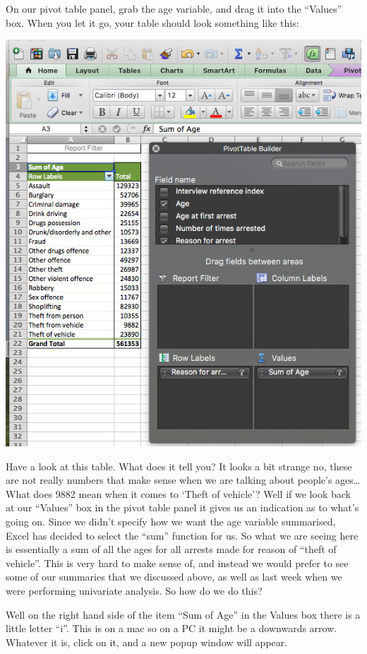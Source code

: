 \documentclass[]{book}
\theoremstyle{definition}
\theoremstyle{definition}
\theoremstyle{definition}
\theoremstyle{remark}
\begin{document}
On our pivot table panel, grab the age variable, and drag it into the
``Values'' box. When you let it go, your table should look something
like this:

\includegraphics{imgs/age_to_value.png}

Have a look at this table. What does it tell you? It looks a bit strange
no, these are not really numbers that make sense when we are talking
about people's ages\ldots{} What does 9882 mean when it comes to `Theft
of vehicle'? Well if we look back at our ``Values'' box in the pivot
table panel it gives us an indication as to what's going on. Since we
didn't specify how we want the age variable summarised, Excel has
decided to select the ``sum'' function for us. So what we are seeing
here is essentially a sum of all the ages for all arrests made for
reason of ``theft of vehicle''. This is very hard to make sense of, and
instead we would prefer to see some of our summaries that we discussed
above, as well as last week when we were performing univariate analysis.
So how do we do this?

Well on the right hand side of the item ``Sum of Age'' in the Values box
there is a little letter ``i''. This is on a mac so on a PC it might be
a downwards arrow. Whatever it is, click on it, and a new popup window
will appear.
\end{document}
